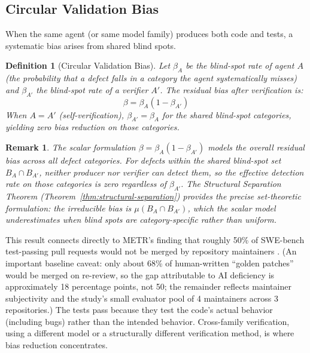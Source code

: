 \documentclass[11pt, a4paper]{googledeepmind}
\newtheorem{definition}{Definition}[section]
\newtheorem*{remark}{Remark}
\begin{document}
\subsection{Circular Validation Bias}

When the same agent (or same model family) produces both code and tests, a systematic bias arises from shared blind spots.

\begin{definition}[Circular Validation Bias]
\label{def:circular-bias}
Let $\beta_A$ be the blind-spot rate of agent $A$ (the probability that a defect falls in a category the agent systematically misses) and $\beta_{A'}$ the blind-spot rate of a verifier $A'$. The residual bias after verification is:
\begin{equation}
    \beta = \beta_A (1 - \beta_{A'})
\end{equation}
When $A = A'$ (self-verification), $\beta_{A'} = \beta_A$ for the shared blind-spot categories, yielding zero bias reduction on those categories.
\end{definition}

\begin{remark}
The scalar formulation $\beta = \beta_A(1 - \beta_{A'})$ models the \emph{overall} residual bias across all defect categories. For defects within the shared blind-spot set $B_A \cap B_{A'}$, neither producer nor verifier can detect them, so the effective detection rate on those categories is zero regardless of $\beta_{A'}$. The Structural Separation Theorem (Theorem~\ref{thm:structural-separation}) provides the precise set-theoretic formulation: the irreducible bias is $\mu(B_A \cap B_{A'})$, which the scalar model underestimates when blind spots are category-specific rather than uniform.
\end{remark}

This result connects directly to METR's finding that roughly 50\% of SWE-bench test-passing pull requests would not be merged by repository maintainers \citep{metr2026swebench}. (An important baseline caveat: only about 68\% of human-written ``golden patches'' would be merged on re-review, so the gap attributable to AI deficiency is approximately 18 percentage points, not 50; the remainder reflects maintainer subjectivity and the study's small evaluator pool of 4 maintainers across 3 repositories.) The tests pass because they test the code's actual behavior (including bugs) rather than the intended behavior. Cross-family verification, using a different model or a structurally different verification method, is where bias reduction concentrates.
\end{document}
